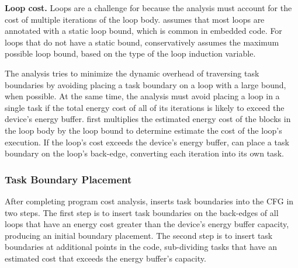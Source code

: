 {\noindent \bf Loop cost.} Loops are a challenge for \sys because the analysis must account for the cost of multiple iterations of the loop body. \sys assumes that most loops are
annotated with a static loop bound, which is common in embedded code. For loops that do not have a static bound, \sys conservatively assumes the maximum possible loop bound, based on the type of the loop induction variable.

The analysis tries to minimize the dynamic overhead of traversing task boundaries by avoiding placing a task boundary on a loop with a large bound, when possible. At the same time, the analysis must avoid placing a loop in a single task if the total energy cost of all of its iterations is likely to exceed the device's energy buffer. \sys first multiplies the estimated energy cost of the blocks in the loop body by the loop bound to determine estimate the cost of the loop's execution. If the loop's cost exceeds the device's energy buffer, \sys can place a task boundary on the loop's back-edge, converting each iteration into its own task.  



\subsubsection{Task Boundary Placement}
\label{sec:compiler_boundary}

After completing program cost analysis, \sys inserts task boundaries into the CFG in two steps. The first step is to insert task boundaries on the back-edges of all loops that have an energy cost greater than the device's energy buffer capacity, producing an initial boundary placement. The second step is to insert task boundaries at additional points in the code, sub-dividing tasks that have an estimated cost that exceeds the energy buffer's capacity.

